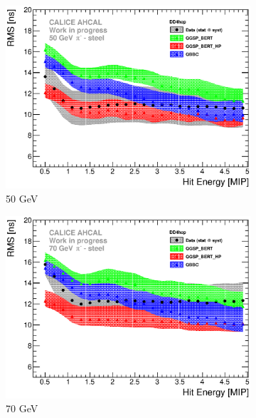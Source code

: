 \begin{figure}[htbp!]
  \begin{subfigure}[t]{0.49\textwidth}
    \centering
    \includegraphics[width=1\textwidth]{../Thesis_Plots/Timing/Pions/Plots/ComparisonToSim/RMS_Energy_50GeV_DD4hep.eps}
    \caption{50 GeV}\label{fig:Energy_RMS_SimData_50GeV_DD4hep}
  \end{subfigure}
  \hfill
  \begin{subfigure}[t]{0.49\textwidth}
    \centering
    \includegraphics[width=1\textwidth]{../Thesis_Plots/Timing/Pions/Plots/ComparisonToSim/RMS_Energy_70GeV_DD4hep.eps}
    \caption{70 GeV}\label{fig:Energy_RMS_SimData_70GeV_DD4hep}
  \end{subfigure}
  \hfill
  \begin{subfigure}[t]{0.49\textwidth}

\end{subfigure}
\end{figure}
